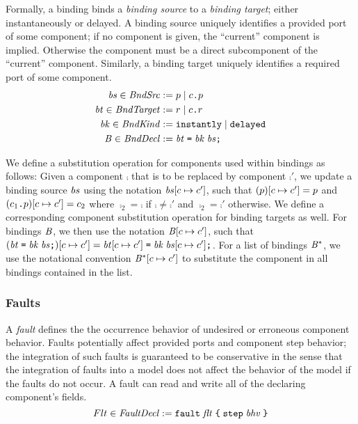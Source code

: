 \documentclass[a4paper,10pt,english]{article}
\begin{document}
Formally, a binding binds a \textit{binding source} to a \textit{binding target}; either instantaneously or delayed. A
binding source uniquely identifies a provided port of some component; if no component is given, the ``current'' component is
implied. Otherwise the component must be a direct subcomponent of the ``current'' component. Similarly, a binding target uniquely
identifies a required port of some component.
\begin{align*} 
	\mathit{bs} \in \mathit{BndSrc} &:=
		p \mid c\texttt{.}p
	\\
	\mathit{bt} \in \mathit{BndTarget} &:=
		r \mid c\texttt{.}r 
	\\
	\mathit{bk} \in \mathit{BndKind} &:=
		\texttt{instantly} \mid \texttt{delayed}
	\\
	\mathit{B} \in \mathit{BndDecl} &:=
		\mathit{bt} \; \texttt{=} \; \mathit{bk} \; \mathit{bs} \texttt{;} 
\end{align*}

We define a substitution operation for components used within bindings as follows: Given a component $\comp$ that is to be
replaced by component $\comp'$, we update a binding source $\mathit{bs}$ using the notation $\mathit{bs}[c
\mapsto c']$, such that $(p)[c \mapsto c'] = p$ and $(c_1\texttt{.}p)[c
\mapsto c'] = c_2$ where $\comp_2 = \comp$ if $\comp \neq \comp'$ and $\comp_2 = \comp'$ otherwise. We define a
corresponding component substitution operation for binding targets as well. For bindings $\mathit{B}$, we then use the
notation $\mathit{B}[c \mapsto c']$, such that
$(\mathit{bt} \; \texttt{=} \; \mathit{bk} \; \mathit{bs} \texttt{;})[c
\mapsto c'] = \mathit{bt}[c \mapsto c'] \; \texttt{=} \; \mathit{bk} \; \mathit{bs}[c \mapsto c'] \texttt{;}$.
For a list of bindings $\mathit{B}^*$, we use the notational convention
$\mathit{B}^*[c \mapsto c']$ to substitute the component in all bindings contained in the list.

\subsubsection{Faults}
A \textit{fault} defines the the occurrence behavior of undesired or erroneous component behavior. Faults potentially affect
provided ports and component step behavior; the integration of such faults is guaranteed to be conservative in the sense that the
integration of faults into a model does not affect the behavior of the model if the faults do not occur. A fault can read and
write all of the declaring component's fields.
\begin{equation*}
	Flt \in \mathit{FaultDecl} := \texttt{fault} \; \mathit{flt} \; \texttt{\{} \; \texttt{step} \; \mathit{bhv} \; \texttt{\}}
\end{equation*} 
\end{document}
